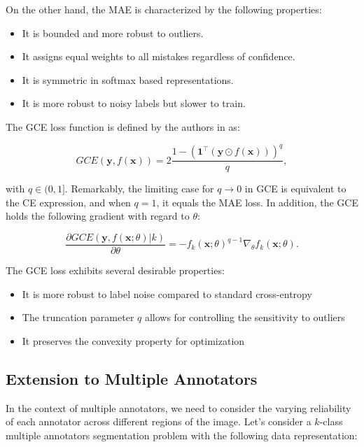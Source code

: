 On the other hand, the \gls{MAE} is characterized by the following properties:

\begin{itemize}
  \item It is bounded and more robust to outliers.
  \item It assigns equal weights to all mistakes regardless of confidence.
  \item It is symmetric in softmax based representations.
  \item It is more robust to noisy labels but slower to train.
\end{itemize}

The GCE loss function is defined by the authors in \cite{ZhangEtAl2018} as:

\begin{equation}
  GCE(\mathbf{y}, f(\mathbf{x})) = 2\frac{1 -
  (\mathbf{1}^\top(\mathbf{y} \odot f(\mathbf{x})))^q}{q},
\end{equation}

with $q \in (0,1]$. Remarkably, the limiting case for $q \to 0$ in
GCE is equivalent to the CE expression, and when $q = 1$, it equals
the MAE loss. In addition, the GCE holds the following gradient with
regard to $\theta$:

\begin{equation}
  \frac{\partial GCE(\mathbf{y}, f(\mathbf{x};\theta)|k)}{\partial
  \theta} = -f_k(\mathbf{x};\theta)^{q-1}\nabla_\theta f_k(\mathbf{x};\theta).
\end{equation}

The GCE loss exhibits several desirable properties:

\begin{itemize}
  \item It is more robust to label noise compared to standard cross-entropy
  \item The truncation parameter $q$ allows for controlling the
    sensitivity to outliers
  \item It preserves the convexity property for optimization
\end{itemize}

\subsection{Extension to Multiple Annotators}

In the context of multiple annotators, we need to consider the
varying reliability of each annotator across different regions of the
image. Let's consider a $k$-class multiple annotators segmentation
problem with the following data representation:

